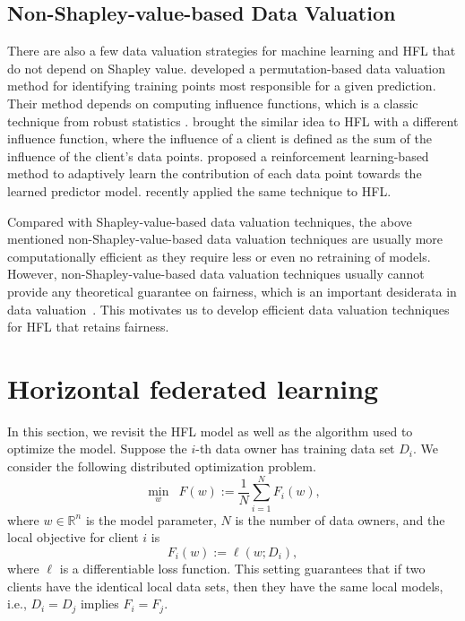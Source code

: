 \subsection{Non-Shapley-value-based Data Valuation}
There are also a few data valuation strategies for machine learning and HFL that do not depend on Shapley value. \citet{koh2017understanding} developed a permutation-based data valuation method for identifying training points most responsible for a given prediction. Their method depends on computing influence functions, which is a classic technique from robust statistics \citep{hampel1974influence}. \citet{wang2019measure} brought the similar idea to HFL with a different influence function, where the influence of a client is defined as the sum of the influence of the client's data points. \citet{yoon2020data} proposed a reinforcement learning-based method to adaptively learn the contribution of each data point towards the learned predictor model. \citet{zhao2021efficient} recently applied the same technique to HFL. 

Compared with Shapley-value-based data valuation techniques, the above mentioned non-Shapley-value-based data valuation techniques are usually more computationally efficient as they require less or even no retraining of models. However, non-Shapley-value-based data valuation techniques usually cannot provide any theoretical guarantee on fairness, which is an important desiderata in data valuation~\citep{ghorbani2019data, pei2020survey}. This motivates us to develop efficient data valuation techniques for HFL that retains fairness. 

\section{Horizontal federated learning} \label{sec:7-3}
In this section, we revisit the HFL model as well as the algorithm used to optimize the model. Suppose the $i$-th data owner has training data set $D_i$. We consider the following distributed optimization problem.
\begin{equation} \label{eq:hfl_problem}
    \min_{w}\enspace F(w) := \frac{1}{N}\sum_{i = 1}^N F_i(w),
\end{equation}
where $w\in\mathbb{R}^n$ is the model parameter, $N$ is the number of data owners, and the local objective for client $i$ is
\begin{equation} \label{eq:loss}
    F_i(w) := \ell(w; D_i),
\end{equation}
where $\ell$ is a differentiable loss function. This setting guarantees that if two clients have the identical local data sets, then they have the same local models, i.e., $D_i=D_j$ implies $F_i=F_j$. 

